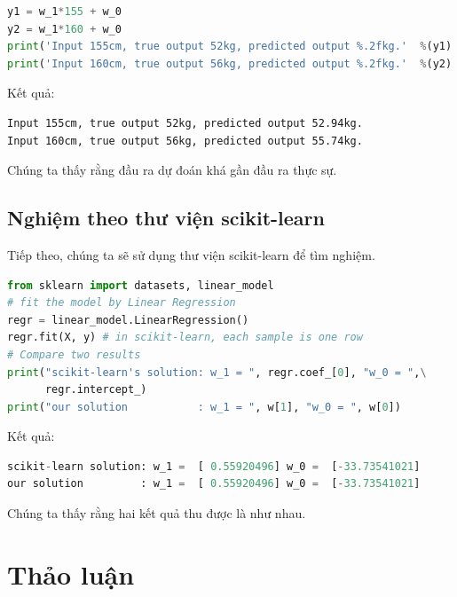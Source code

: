 \begin{lstlisting}[language=Python]
y1 = w_1*155 + w_0
y2 = w_1*160 + w_0
print('Input 155cm, true output 52kg, predicted output %.2fkg.'  %(y1) )
print('Input 160cm, true output 56kg, predicted output %.2fkg.'  %(y2) )
\end{lstlisting}
Kết quả:
\begin{lstlisting}
Input 155cm, true output 52kg, predicted output 52.94kg.
Input 160cm, true output 56kg, predicted output 55.74kg.
\end{lstlisting}

Chúng ta thấy rằng đầu ra dự đoán khá gần đầu ra thực sự.


\subsection{Nghiệm theo thư viện scikit-learn}

Tiếp theo, chúng ta sẽ sử dụng thư viện scikit-learn để tìm nghiệm.

\begin{lstlisting}[language=Python]
from sklearn import datasets, linear_model
# fit the model by Linear Regression
regr = linear_model.LinearRegression()
regr.fit(X, y) # in scikit-learn, each sample is one row
# Compare two results
print("scikit-learn's solution: w_1 = ", regr.coef_[0], "w_0 = ",\
      regr.intercept_)
print("our solution           : w_1 = ", w[1], "w_0 = ", w[0])
\end{lstlisting}
Kết quả:
\begin{lstlisting}[language=Python]
scikit-learn solution: w_1 =  [ 0.55920496] w_0 =  [-33.73541021]
our solution         : w_1 =  [ 0.55920496] w_0 =  [-33.73541021]
\end{lstlisting}

Chúng ta thấy rằng hai kết quả thu được là như nhau.


\section{Thảo luận}


